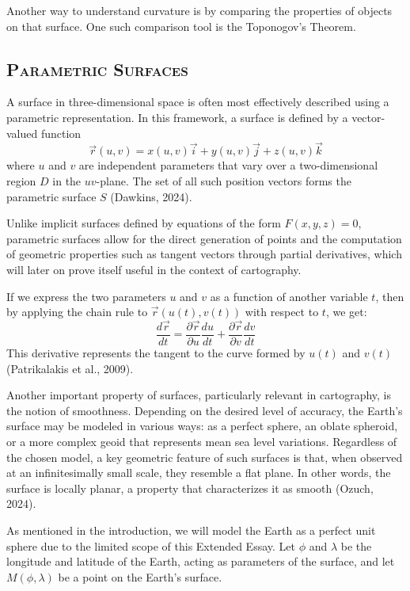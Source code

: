 Another way to understand curvature is by comparing the properties of objects on that surface. One such comparison tool is
the Toponogov's Theorem.

\pagebreak
\subsection{\textsc{Parametric Surfaces}}
\vspace*{-10pt}
A surface in three-dimensional space is often most effectively 
described using a parametric representation. In this framework, a 
surface is defined by a vector-valued function
\begin{equation}
    \vec{r}(u,v)=x(u,v)\vec{i} + y(u,v)\vec{j} + z(u,v)\vec{k}
\end{equation}
where $u$ and $v$ are independent parameters that vary over a 
two-dimensional region $D$ in the $uv$-plane. The set of all such position 
vectors forms the parametric surface $S$ (Dawkins, 2024).

Unlike implicit surfaces defined by equations of the form $F(x,y,z)=0$, parametric
surfaces allow for the direct generation of points and the computation of geometric
properties such as tangent vectors through partial derivatives, which will later 
on prove itself useful in the context of cartography.

If we express the two parameters $u$ and $v$ as a function of another variable
$t$, then by applying the chain rule to $\vec{r}(u(t),v(t))$ with respect to 
$t$, we get:
\begin{equation}
    \frac{d\vec{r}}{dt}=\frac{\partial \vec{r}}{\partial u}\frac{du}{dt}+\frac{\partial \vec{r}}{\partial v}\frac{dv}{dt}
\end{equation}
This derivative represents the tangent to the curve formed by $u(t)$ and $v(t)$ 
(Patrikalakis et al., 2009).

Another important property of surfaces, particularly relevant in cartography, 
is the notion of smoothness. Depending on the desired level of accuracy, the 
Earth's surface may be modeled in various ways: as a perfect sphere, an oblate 
spheroid, or a more complex geoid that represents mean sea level variations. 
Regardless of the chosen model, a key geometric feature of such surfaces is 
that, when observed at an infinitesimally small scale, they resemble a flat 
plane. In other words, the surface is locally planar, a property that 
characterizes it as smooth (Ozuch, 2024).

As mentioned in the introduction, we will model the Earth as a perfect unit sphere
due to the limited scope of this Extended Essay. Let $\phi$ and $\lambda$ be
the longitude and latitude of the Earth, acting as parameters of the surface, 
and let $M(\phi,\lambda)$ be a point on the Earth's surface. 

